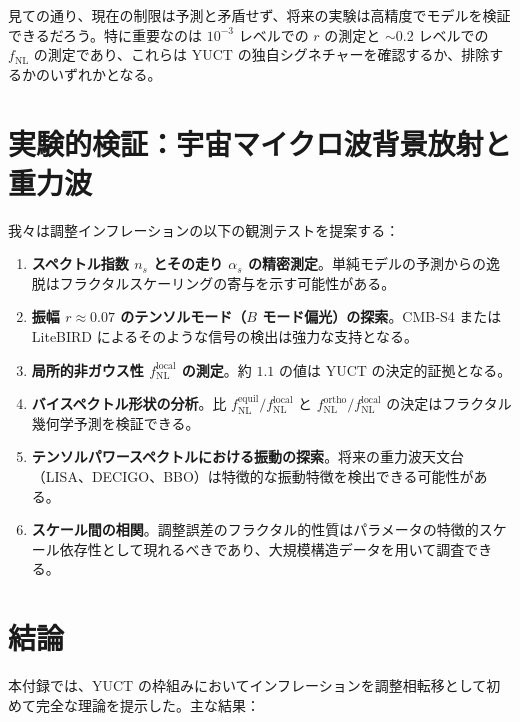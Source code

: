 \documentclass[11pt,a4paper]{article}
\theoremstyle{remark}
\begin{document}
	見ての通り、現在の制限は予測と矛盾せず、将来の実験は高精度でモデルを検証できるだろう。特に重要なのは $10^{-3}$ レベルでの $r$ の測定と $\sim 0.2$ レベルでの $f_{\text{NL}}$ の測定であり、これらは YUCT の独自シグネチャーを確認するか、排除するかのいずれかとなる。
	
	\section{実験的検証：宇宙マイクロ波背景放射と重力波}
	\label{sec:tests}
	
	我々は調整インフレーションの以下の観測テストを提案する：
	
	\begin{enumerate}
		\item \textbf{スペクトル指数 $n_s$ とその走り $\alpha_s$ の精密測定}。単純モデルの予測からの逸脱はフラクタルスケーリングの寄与を示す可能性がある。
		\item \textbf{振幅 $r \approx 0.07$ のテンソルモード（$B$ モード偏光）の探索}。CMB‑S4 または LiteBIRD によるそのような信号の検出は強力な支持となる。
		\item \textbf{局所的非ガウス性 $f_{\text{NL}}^{\text{local}}$ の測定}。約 $1.1$ の値は YUCT の決定的証拠となる。
		\item \textbf{バイスペクトル形状の分析}。比 $f_{\text{NL}}^{\text{equil}}/f_{\text{NL}}^{\text{local}}$ と $f_{\text{NL}}^{\text{ortho}}/f_{\text{NL}}^{\text{local}}$ の決定はフラクタル幾何学予測を検証できる。
		\item \textbf{テンソルパワースペクトルにおける振動の探索}。将来の重力波天文台（LISA、DECIGO、BBO）は特徴的な振動特徴を検出できる可能性がある。
		\item \textbf{スケール間の相関}。調整誤差のフラクタル的性質はパラメータの特徴的スケール依存性として現れるべきであり、大規模構造データを用いて調査できる。
	\end{enumerate}
	
	\section{結論}
	\label{sec:conclusion}
	
	本付録では、YUCT の枠組みにおいてインフレーションを調整相転移として初めて完全な理論を提示した。主な結果：
	
\end{document}
